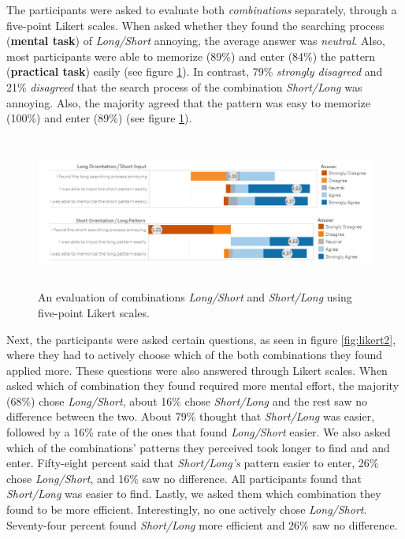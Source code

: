The participants were asked to evaluate both \textit{combinations} separately, through a five-point Likert scales. When asked whether they found the searching process (\textbf{mental task}) of \textit{Long/Short} annoying, the average answer was \textit{neutral}. Also, most participants were able to memorize (89\%) and enter (84\%) the pattern (\textbf{practical task}) easily (see figure \ref{fig:likert}). In contrast, 79\% \textit{strongly disagreed} and 21\% \textit{disagreed} that the search process of the combination \textit{Short/Long} was annoying. Also, the majority agreed that the pattern was easy to memorize (100\%) and enter (89\%) (see figure \ref{fig:likert}).
 
 \begin{figure}[t!]
\centering
\includegraphics[width=15cm, height=5cm]{Chapters/graphics/Likert1213.PNG}
\caption{An evaluation of combinations \textit{Long/Short} and \textit{Short/Long} using five-point Likert scales. }
\label{fig:likert}
\end{figure}

Next, the participants were asked certain questions, as seen in figure \ref{fig:likert2}, where they had to actively choose which of the both combinations they found applied more. These questions were also answered through Likert scales. When asked which of combination they found required more mental effort, the majority (68\%) chose \textit{Long/Short}, about 16\% chose \textit{Short/Long} and the rest saw no difference between the two. 
About 79\% thought that \textit{Short/Long} was easier, followed by a 16\% rate of the ones that found \textit{Long/Short} easier. We also asked which of the combinations' patterns they perceived took longer to find and and enter. Fifty-eight percent said that \textit{Short/Long's} pattern easier to enter, 26\% chose \textit{Long/Short}, and 16\% saw no difference. All participants found that \textit{Short/Long} was easier to find. Lastly, we asked them which combination they found to be more efficient. Interestingly, no one actively chose \textit{Long/Short}. Seventy-four percent found \textit{Short/Long} more efficient and 26\% saw no difference. \\


